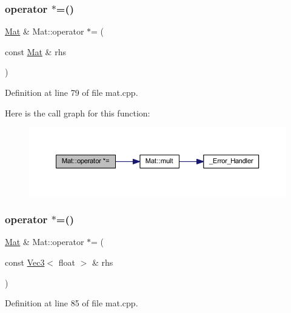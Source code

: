 \subsubsection{\texorpdfstring{operator $\ast$=()}{operator *=()}\hspace{0.1cm}{\footnotesize\ttfamily [1/2]}}
{\footnotesize\ttfamily \mbox{\hyperlink{class_mat}{Mat}} \& Mat\+::operator $\ast$= (\begin{DoxyParamCaption}\item[{const \mbox{\hyperlink{class_mat}{Mat}} \&}]{rhs }\end{DoxyParamCaption})}



Definition at line 79 of file mat.\+cpp.

Here is the call graph for this function\+:
\nopagebreak
\begin{figure}[H]
\begin{center}
\leavevmode
\includegraphics[width=350pt]{class_mat_aaf9946bb579ab98e5f1b3c554da11cc9_cgraph}
\end{center}
\end{figure}
\mbox{\label{class_mat_a8f508e70094f29bf8bd428e3d41013e8}} 
\subsubsection{\texorpdfstring{operator $\ast$=()}{operator *=()}\hspace{0.1cm}{\footnotesize\ttfamily [2/2]}}
{\footnotesize\ttfamily \mbox{\hyperlink{class_mat}{Mat}} \& Mat\+::operator $\ast$= (\begin{DoxyParamCaption}\item[{const \mbox{\hyperlink{class_vec3}{Vec3}}$<$ float $>$ \&}]{rhs }\end{DoxyParamCaption})}



Definition at line 85 of file mat.\+cpp.

